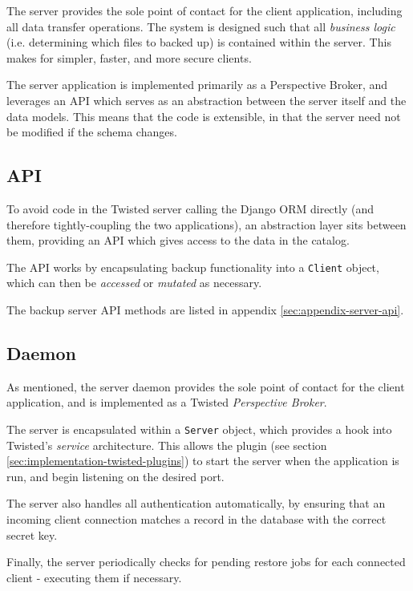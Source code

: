The server provides the sole point of contact for the client application,
including all data transfer operations. The system is designed such that all
\emph{business logic} (i.e. determining which files to backed up) is contained
within the server. This makes for simpler, faster, and more secure clients.

The server application is implemented primarily as a Perspective Broker, and
leverages an API which serves as an abstraction between the server itself and
the data models. This means that the code is extensible, in that the server
need not be modified if the schema changes.

\subsection{API}
\label{sec:implementation-server-api}

To avoid code in the Twisted server calling the Django ORM directly (and
therefore tightly-coupling the two applications), an abstraction layer sits
between them, providing an API which gives access to the data in the catalog.

The API works by encapsulating backup functionality into a \verb!Client!
object, which can then be \emph{accessed} or \emph{mutated} as necessary.

The backup server API methods are listed in appendix
\ref{sec:appendix-server-api}.

\subsection{Daemon}
\label{sec:implementation-server-daemon}

As mentioned, the server daemon provides the sole point of contact for the
client application, and is implemented as a Twisted \emph{Perspective Broker}.

The server is encapsulated within a \verb!Server! object, which provides a hook
into Twisted's \emph{service} architecture. This allows the plugin (see section
\ref{sec:implementation-twisted-plugins}) to start the server when the
application is run, and begin listening on the desired port.

The server also handles all authentication automatically, by ensuring that
an incoming client connection matches a record in the database with the correct
secret key.

Finally, the server periodically checks for pending restore jobs for each
connected client - executing them if necessary.

